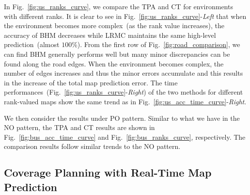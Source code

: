 In Fig.~\ref{fig:us_ranks_curve}, we compare the TPA and CT for environments with different ranks. It is clear to see in Fig.~\ref{fig:us_ranks_curve}-\textit{Left} that when the environment becomes more complex~(as the rank value increases), the accuracy of BHM decreases while LRMC maintains the same high-level prediction~(almost $100\%$). From the first row of Fig.~\ref{fig:road_comparison}, we can find BHM generally performs well but many minor discrepancies can be found along the road edges.  When the environment becomes complex, the number of edges increases and thus the minor errors accumulate and this results in the increase of the total map prediction error. The time performances~(Fig.~\ref{fig:us_ranks_curve}-\textit{Right}) of the two methods for different rank-valued maps show the same trend as in Fig.~\ref{fig:us_acc_time_curve}-\textit{Right}.

We then consider the results under PO pattern. Similar to what we have in the NO pattern, the TPA and CT results are shown in Fig.~\ref{fig:bus_acc_time_curve} and Fig.~\ref{fig:bus_ranks_curve}, respectively. The comparison results follow similar trends to the NO pattern. 



\subsection{Coverage Planning with Real-Time Map Prediction}

